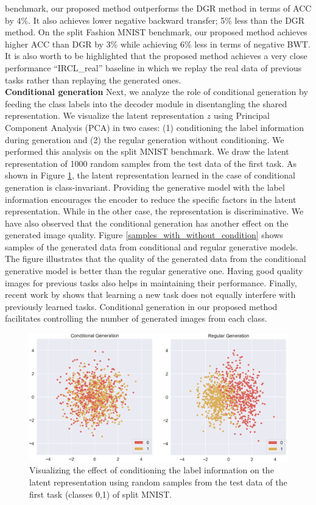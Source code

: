 \documentclass[letterpaper]{article} %
\begin{document}
 benchmark, our proposed method outperforms the DGR method in terms of ACC by 4\%. It also achieves lower negative backward transfer; 5\% less than the DGR method. On the split Fashion MNIST benchmark, our proposed method achieves higher ACC than DGR by 3\% while achieving 6\% less in terms of negative BWT. It is also worth to be highlighted that the proposed method achieves a very close performance \enquote{IRCL\_real} baseline in which we replay the real data of previous tasks rather than replaying the generated ones.\\

\textbf{Conditional generation} Next, we analyze the role of conditional generation by feeding the class labels into the decoder module in disentangling the shared representation. We visualize the latent representation $z$ using Principal Component Analysis (PCA) \cite{wold1987principal} in two cases: (1) conditioning the label information during generation and (2) the regular generation without conditioning. We performed this analysis on the split MNIST benchmark. We draw the latent representation of 1000 random samples from the test data of the first task. As shown in Figure \ref{z_with_conditioning}, the latent representation learned in the case of conditional generation is class-invariant. Providing the generative model with the label information encourages the encoder to reduce the specific factors in the latent representation. While in the other case, the representation is discriminative. We have also observed that the conditional generation has another effect on the generated image quality. Figure \ref{samples_with_without_condition} shows samples of the generated data from conditional and regular generative models. The figure illustrates that the quality of the generated data from the conditional generative model is better than the regular generative one. Having good quality images for previous tasks also helps in maintaining their performance.  Finally, recent work by \cite{aljundi2019online} shows that learning a new task does not equally interfere with previously learned tasks. Conditional generation in our proposed method facilitates controlling the number of generated images from each class.\\
\begin{figure}[ht]
\centering
\includegraphics[width=\columnwidth]{pic/conditioningvsnotconditioning.png}
\caption{Visualizing the effect of conditioning the label information on the latent representation using random samples from the test data of the first task (classes 0,1) of split MNIST.}
\label{z_with_conditioning}
\end{figure}
\end{document}
